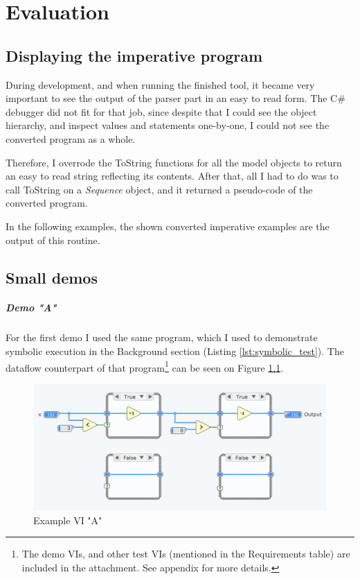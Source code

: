 \chapter{Evaluation}
\label{chap:evaluation}
\section{Displaying the imperative program}
During development, and when running the finished tool, it became very important to see the output of the parser part in an easy to read form. The C\# debugger did not fit for that job, since despite that I could see the object hierarchy, and inspect values and statements one-by-one, I could not see the converted program as a whole. 

Therefore, I overrode the ToString functions for all the model objects to return an easy to read string reflecting its contents. After that, all I had to do was to call ToString on a \textit{Sequence} object, and it returned a pseudo-code of the converted program.

In the following examples, the shown converted imperative examples are the output of this routine.
\section{Small demos}
\paragraph{Demo "A"}
For the first demo I used the same program, which I used to demonstrate symbolic execution in the Background section (Listing \ref{lst:symbolic_test}). The dataflow counterpart of that program\footnote{The demo VIs, and other test VIs (mentioned in the Requirements table) are included in the attachment. See appendix for more details.} can be seen on Figure \ref{fig:testvi1}.
\begin{figure}
\centering
\includegraphics[width=150mm,keepaspectratio]{figures/testvi1.png}
\caption{Example VI "A"} 
\label{fig:testvi1}
\end{figure}

